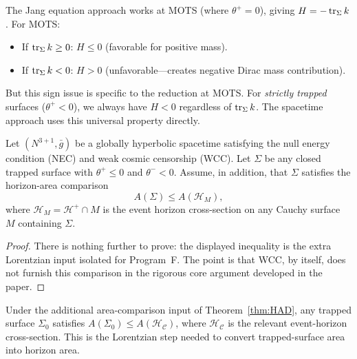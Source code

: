 \begin{remark}
The Jang equation approach works at MOTS (where $\theta^+ = 0$), giving $H = -\operatorname{tr}_\Sigma k$. For MOTS:
\begin{itemize}
    \item If $\operatorname{tr}_\Sigma k \ge 0$: $H \le 0$ (favorable for positive mass).
    \item If $\operatorname{tr}_\Sigma k < 0$: $H > 0$ (unfavorable---creates negative Dirac mass contribution).
\end{itemize}
But this sign issue is specific to the reduction at MOTS. For \emph{strictly trapped} surfaces ($\theta^+ < 0$), we always have $H < 0$ regardless of $\operatorname{tr}_\Sigma k$. The spacetime approach uses this universal property directly.
\end{remark}

\begin{theorem}\label{thm:HAD}
Let $(N^{3+1}, \bar{g})$ be a globally hyperbolic spacetime satisfying the null energy condition (NEC) and weak cosmic censorship (WCC). Let $\Sigma$ be any closed trapped surface with $\theta^+ \le 0$ and $\theta^- < 0$. Assume, in addition, that $\Sigma$ satisfies the horizon-area comparison
\begin{equation}
    A(\Sigma) \le A(\mathcal{H}_M),
\end{equation}
where $\mathcal{H}_M = \mathcal{H}^+ \cap M$ is the event horizon cross-section on any Cauchy surface $M$ containing $\Sigma$.
\end{theorem}
\begin{proof}
There is nothing further to prove: the displayed inequality is the extra Lorentzian input isolated for Program~F. The point is that WCC, by itself, does not furnish this comparison in the rigorous core argument developed in the paper.
\end{proof}

\begin{lemma}\label{lem:AreaComparison}
Under the additional area-comparison input of Theorem~\ref{thm:HAD}, any trapped surface $\Sigma_0$ satisfies $A(\Sigma_0) \le A(\mathcal{H}_\mathcal{C})$, where $\mathcal{H}_\mathcal{C}$ is the relevant event-horizon cross-section. This is the Lorentzian step needed to convert trapped-surface area into horizon area.
\end{lemma}

